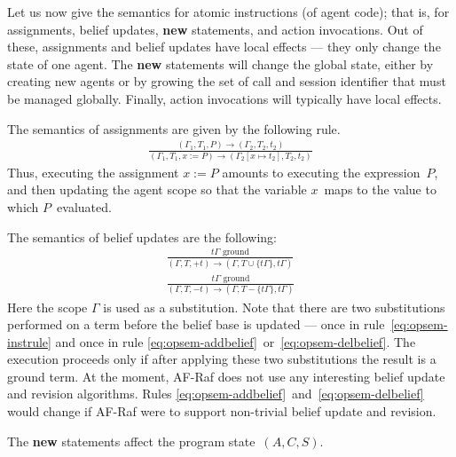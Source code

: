 \documentclass[a4paper,12pt,oneside,fleqn]{book} %
\begin{document}
{Let us now give the semantics for atomic instructions (of agent code); that
is, for assignments, belief updates, {\bf new} statements, and action
invocations.  Out of these, assignments and belief updates have local
effects --- they only change the state of one agent. The {\bf new}
statements will change the global state, either by creating new agents or
by growing the set of call and session identifier that must be managed
globally. Finally, action invocations will typically have local effects.

The semantics of assignments are given by the following rule.
\begin{align}
\frac
  {(\Gamma_1,T_1,P)\to(\Gamma_2,T_2,t_2)}
  {(\Gamma_1,T_1,x:=P)\to(\Gamma_2[x\mapsto t_2],T_2,t_2)}
\end{align}
Thus, executing the assignment $x:=P$ amounts to executing the
expression~$P$, and then updating the agent scope so that the variable
$x$~maps to the value to which $P$~evaluated.

The semantics of belief updates are the following:
\begin{align}
\frac
  {\text{$t\Gamma$ ground}}
  {(\Gamma,T,+t)\to(\Gamma,T\cup\{t\Gamma\}, t\Gamma)}
  \label{eq:opsem-addbelief}
\\[1ex]
\frac
  {\text{$t\Gamma$ ground}}
  {(\Gamma,T,-t)\to(\Gamma,T-\{t\Gamma\}, t\Gamma)}
  \label{eq:opsem-delbelief}
\end{align}
Here the scope $\Gamma$ is used as a substitution. Note that there are two
substitutions performed on a term before the belief base is updated ---
once in rule~\eqref{eq:opsem-instrule} and once in rule
\eqref{eq:opsem-addbelief}~or~\eqref{eq:opsem-delbelief}. The execution
proceeds only if after applying these two substitutions the result is a
ground term. At the moment, AF-Raf does not use any interesting belief
update and revision algorithms. Rules
\eqref{eq:opsem-addbelief}~and~\eqref{eq:opsem-delbelief} would change if
AF-Raf were to support non-trivial belief update and revision.

The {\bf new} statements affect the program state~$(A,C,S)$.

}
\end{document}
